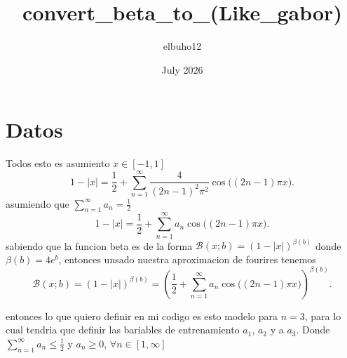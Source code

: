 \documentclass[17pt]{extarticle}
\title{convert_beta_to_(Like_gabor)}
\author{elbuho12 }
\date{July 2026}
\begin{document}

\section{Datos}
Todos esto es asumiento $x\in[-1,1]$
\[ 1- \lvert x \rvert =\frac{1}{2} + \sum_{n=1}^{\infty} \frac{4}{(2n-1)^2\pi^2}\cos\bigl((2n-1)\pi x\bigr). \]
asumiendo que $ \sum_{n=1}^{\infty} a_{n}=\frac{1}{2}$
\[  1- \lvert x \rvert=\frac{1}{2} + \sum_{n=1}^{\infty} a_{n}\cos\bigl((2n-1)\pi x\bigr). \]
sabiendo que la funcion beta es de la forma $\mathcal{B}(x;b)=(1- \lvert x\rvert)^{\beta(b)}$ donde $\beta(b)=4e^{b}$, entonces unsado nuestra aproximacion de fourires tenemos
\[  \mathcal{B}(x;b)=(1- \lvert x \rvert)^{\beta(b)}=(\frac{1}{2} + \sum_{n=1}^{\infty} a_{n}\cos\bigl((2n-1)\pi x\bigr))^{\beta(b)}. \]

entonces lo que quiero definir en mi codigo es esto modelo para $n=3$, para lo cual tendria que definir las bariables de entrenamiento $a_1$, $a_2$ y a $a_3$.
Donde $\sum_{n=1}^{\infty} a_{n}\leq\frac{1}{2}$ y $a_n\geq0$, $\forall n\in [1,\infty]$
\end{document}
